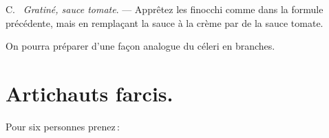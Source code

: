 \medskip

C. \textit{ Gratiné, sauce tomate}. — Apprêtez les finocchi comme dans la formule
précédente, mais en remplaçant la sauce à la crème par de la sauce tomate.

\sk

On pourra préparer d'une façon analogue du céleri en branches.

\section*{\centering Artichauts farcis.}
{}

Pour six personnes prenez :

